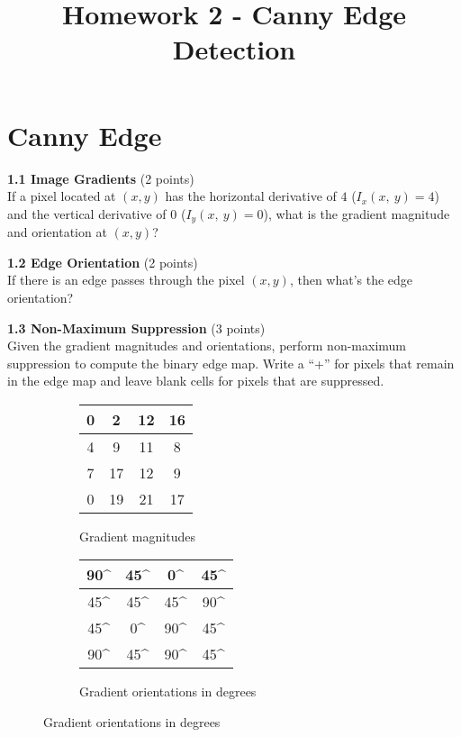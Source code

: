 \documentclass[a4paper]{article}
\title{\date{\vspace{-5ex}}
Homework 2 - Canny Edge Detection \\
}
\begin{document}
\maketitle
\thispagestyle{empty}
\pagestyle{empty}

\section{Canny Edge}

\textbf{1.1 Image Gradients} (2 points)\\
If a pixel located at $(x, y)$ has the horizontal derivative of $4$ ($I_x(x,\ y) = 4$) and the vertical derivative of $0$ ($I_y(x,\ y) = 0$), what is the gradient magnitude and orientation at $(x, y)$?\\
\vspace{10mm}

\noindent  \textbf{1.2 Edge Orientation} (2 points)\\
If there is an edge passes through the pixel $(x,y)$, then what's the edge orientation?\\
\vspace{10mm}

\noindent \textbf{1.3 Non-Maximum Suppression} (3 points)\\
Given the gradient magnitudes and orientations, perform non-maximum suppression to compute the binary edge map. Write a ``+'' for pixels that remain in the edge map and leave blank cells for pixels that are suppressed.

\begin{figure}[!h]
	\begin{subfigure}{.5\textwidth}
	\centering
\begin{tabular}{|c|c|c|c|}
	\hline
	0 & 2 & 12 & 16   \\ \hline
	4 & 9 & 11 & 8   \\ \hline
	7 & 17 & 12 & 9   \\ \hline
	0 & 19 & 21 & 17   \\ \hline
\end{tabular}
\caption{Gradient magnitudes}
\end{subfigure}
	\begin{subfigure}{.5\textwidth}
	\centering
\begin{tabular}{|c|c|c|c|}
	\hline
	90^{\circ} & 45^{\circ} & 0^{\circ} & 45^{\circ}   \\ \hline
	45^{\circ} & 45^{\circ} & 45^{\circ} & 90^{\circ}   \\ \hline
	45^{\circ} & 0^{\circ} & 90^{\circ} & 45^{\circ}   \\ \hline
	90^{\circ} & 45^{\circ} & 90^{\circ} & 45^{\circ}   \\ \hline
\end{tabular}
	\caption{Gradient orientations in degrees}
\end{subfigure}

\end{figure}
\end{document}
